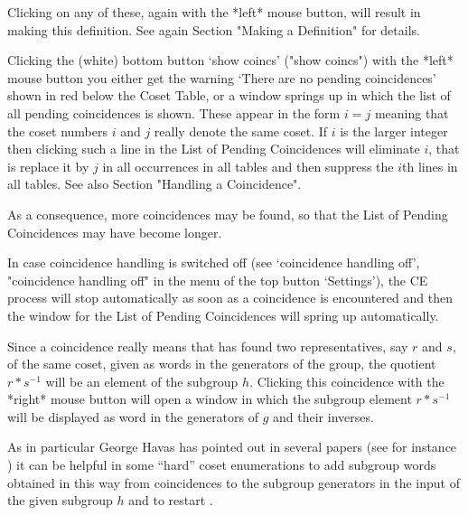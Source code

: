Clicking on any of these, again with the *left* mouse button, will
result in making this definition. See again Section "Making a
Definition" for details.



Clicking the (white) bottom button `show coincs' ("show coincs") with
the *left* mouse button you either get the warning `There are no
pending coincidences' shown in red below the Coset Table, or a window
springs up in which the list of all pending coincidences is shown.
These appear in the form $i = j$ meaning that the coset numbers $i$
and $j$ really denote the same coset. If $i$ is the larger integer
then clicking such a line in the List of Pending Coincidences will
eliminate $i$, that is replace it by $j$ in all occurrences in all
tables and then suppress the $i$th lines in all tables. See also
Section "Handling a Coincidence".

As a consequence, more coincidences may be found, so that the List of
Pending Coincidences may have become longer.

In case coincidence handling is switched off (see `coincidence
handling off', "coincidence handling off" in the menu of the top
button `Settings'), the CE process will stop automatically as soon as
a coincidence is encountered and then the window for the List of
Pending Coincidences will spring up automatically.

Since a coincidence really means that {\ITC} has found two
representatives, say $r$ and $s$, of the same coset, given as words
in the generators of the group, the quotient
$r*s^{-1}$ will be an element of the subgroup $h$. Clicking this
coincidence with the *right* mouse button will open a window in which
the subgroup element $r*s^{-1}$ will be displayed as word in the
generators of $g$ and their inverses.

As in particular George Havas has pointed out in several papers (see
for instance \cite{HR99b}) it can be helpful in some ``hard'' coset
enumerations to add subgroup words obtained in this way from
coincidences to the subgroup generators in the {\GAP} input of the
given subgroup $h$ and to restart {\ITC}.



